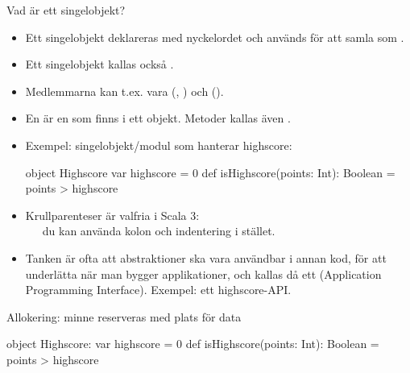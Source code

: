 
\begin{Slide}{Vad är ett singelobjekt?}
\begin{itemize}\SlideFontSmall
\item Ett singelobjekt  deklareras med nyckelordet  och används för att samla   som .
\item Ett singelobjekt kallas också  .
\item Medlemmarna kan t.ex. vara  (, ) och  (). 
\item En  är en  som finns i ett objekt. Metoder kallas även .
\item Exempel: singelobjekt/modul som hanterar highscore:
\begin{Code}
object Highscore {
  var highscore = 0
  def isHighscore(points: Int): Boolean = points > highscore
}
\end{Code}
\item Krullparenteser är valfria i Scala 3:\\~~~du kan använda kolon och indentering i stället.
\pause
\item Tanken är ofta att abstraktioner ska vara användbar i annan kod, för att underlätta när man bygger applikationer, och kallas då ett  (Application Programming Interface). Exempel: ett highscore-API.
\end{itemize}
\end{Slide}


\begin{Slide}{Allokering: minne reserveras med plats för data}
\begin{Code}
object Highscore:
  var highscore = 0
  def isHighscore(points: Int): Boolean = points > highscore

\end{Code}
\pause
{}
\end{Slide}


